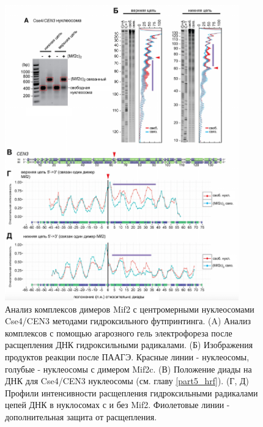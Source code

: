 \begin{figure}[H]
    \centering
    \includegraphics[width=0.9\textwidth]{images/p6/p6_4/p6_5_f5.pdf}
    \caption[Анализ комплексов димеров Mif2 с центромерными нуклеосомами Cse4/CEN3 методами гидроксильного футпринтинга]{Анализ комплексов димеров Mif2 с центромерными нуклеосомами Cse4/CEN3 методами гидроксильного футпринтинга. (A) Анализ комплексов с помощью агарозного гель электрофореза после расщепления ДНК гидроксильными радикалами. (Б) Изображения продуктов реакции после ПААГЭ. Красные линии  - нуклеосомы, голубые - нуклеосомы с димером Mif2c. (В) Положение  диады на ДНК для Cse4/CEN3 нуклеосомы (см. главу \ref{part5_hrf}). (Г, Д) Профили интенсивности расщепления гидроксильными радикалами цепей ДНК в нуклосомах с и без Mif2. Фиолетовые линии - дополнительная защита от расщепления.}
    \label{fig:p6_5_f5}
\end{figure}

